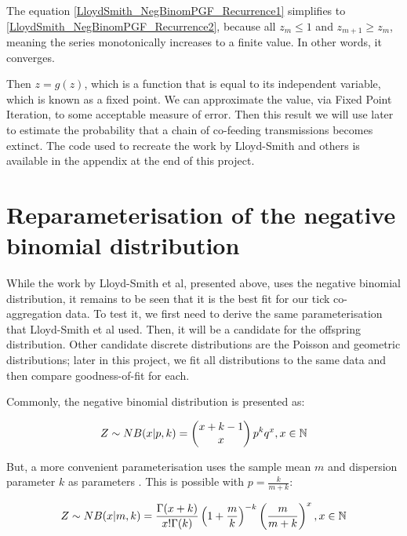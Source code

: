 \documentclass{article}
\begin{document}
The equation \eqref{LloydSmith_NegBinomPGF_Recurrence1} simplifies to \eqref{LloydSmith_NegBinomPGF_Recurrence2}, because all $ z_m \le 1 $ and $ z_{m+1} \ge z_m $, meaning the series monotonically increases to a finite value. In other words, it converges.

Then $z = g(z) $, which is a function that is equal to its independent variable, which is known as a fixed point. We can approximate the value, via Fixed Point Iteration, to some acceptable measure of error. Then this result we will use later to estimate the probability that a chain of co-feeding transmissions becomes extinct. The code used to recreate the work by Lloyd-Smith and others is available in the appendix at the end of this project.

\newpage

\section{Reparameterisation of the negative binomial distribution}

While the work by Lloyd-Smith et al, presented above, uses the negative binomial distribution, it remains to be seen that it is the best fit for our tick co-aggregation data. To test it, we first need to derive the same parameterisation that Lloyd-Smith et al used. Then, it will be a candidate for the offspring distribution. Other candidate discrete distributions are the Poisson and geometric distributions; later in this project, we fit all distributions to the same data and then compare goodness-of-fit for each.

Commonly, the negative binomial distribution is presented as:

\begin{equation}\label{NegBinom}
	Z \sim NB(x | p, k) = \left(\begin{matrix}x+k-1 \\ x \end{matrix}\right) \space p^k q^x, \space \space \space \space \space x \in \mathbb{N}
\end{equation}

But, a more convenient parameterisation uses the sample mean $ m $ and dispersion parameter $ k $ as parameters \cite{Rice2007}. This is possible with $ p = \frac{k}{m+k} $:

\begin{equation}\label{NegBinomReparam}
    Z \sim NB(x | m, k) = \frac{\Gamma(x+k)}{x!\Gamma(k)} \space \left(1+\frac{m}{k}\right)^{-k} \space \left(\frac{m}{m+k}\right)^x, \space \space \space \space \space x \in \mathbb{N}
\end{equation}
\end{document}
